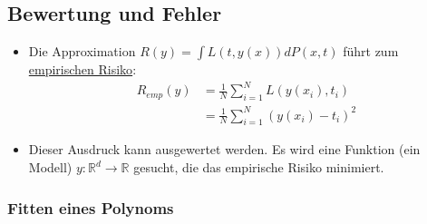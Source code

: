 \documentclass{scrartcl}
\begin{document}
\subsection{Bewertung und Fehler}

\begin{itemize}
	\item Die Approximation $ R(y) = \int L(t, y(x)) dP(x,t) $ führt zum 
	\underline{empirischen Risiko}:
	\begin{align*}
		R_{emp}(y) &= \frac{1}{N} \sum_{i=1}^{N} L(y(x_i), t_i) \\
		&= \frac{1}{N} \sum_{i=1}^{N} (y(x_i) - t_i)^2
	\end{align*}
	\item Dieser Ausdruck kann ausgewertet werden. Es wird eine Funktion (ein 
	Modell) $ y: \mathbb{R}^d \rightarrow \mathbb{R} $ gesucht, die das 
	empirische Risiko minimiert.
\end{itemize}

\subsubsection{Fitten eines Polynoms}
\end{document}
